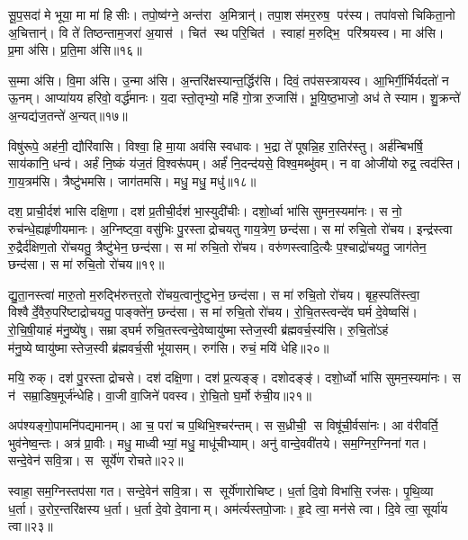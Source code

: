 सू॒प॒सदा॑ मे भूया॒ मा मा॑ हिसीः। तपो॒ष्व॑ग्ने॒ अन्त॑रा अ॒मित्रान्॑। तपा॒शस॑मर॒रुष॒ पर॑स्य। तपा॑वसो चिकिता॒नो अ॒चित्तान्॑। वि ते॑ तिष्ठन्ताम॒जरा॑ अ॒यास॑। चित॑ स्थ परि॒चित॑। स्वाहा॑ म॒रुद्भि॒ परि॑श्रयस्व। मा अ॑सि। प्र॒मा अ॑सि। प्र॒ति॒मा अ॑सि॥१६॥

स॒म्मा अ॑सि। वि॒मा अ॑सि। उ॒न्मा अ॑सि। अ॒न्तरि॑क्षस्यान्त॒र्द्धिर॑सि। दिवं॒ तप॑सस्त्रायस्व। आ॒भिर्गी॒र्भिर्यदतो॑ न ऊ॒नम्। आप्या॑यय हरिवो॒ वर्द्ध॑मानः। य॒दा स्तो॒तृभ्यो॒ महि॑ गो॒त्रा रु॒जासि॑। भू॒यि॒ष्ठ॒भाजो॒ अध॑ ते स्याम। शु॒क्रन्ते॑ अ॒न्यद्य॑ज॒तन्ते॑ अ॒न्यत्॥१७॥

विषु॑रूपे॒ अह॑नी॒ द्यौरि॑वासि। विश्वा॒ हि मा॒या अव॑सि स्वधावः। भ॒द्रा ते॑ पूषन्नि॒ह रा॒तिर॑स्तु। अर्\mbox{}ह॑न्बिभर्\mbox{}षि॒ साय॑कानि॒ धन्व॑। अर्\mbox{}हं नि॒ष्कं य॑ज॒तं  वि॒श्वरू॑पम्। अर्\mbox{}हं॑ नि॒दन्द॑यसे॒ विश्व॒मब्भु॑वम्। न वा ओजी॑यो रुद्र॒ त्वद॑स्ति। गा॒य॒त्रम॑सि। त्रैष्टु॑भमसि। जाग॑तमसि। मधु॒ मधु॒ मधु॑॥१८॥
\anuvakamend[अ॒न॒क्त्व॒सा॒दी॒दु॒त्त॒र॒तः पा॑हि प्रति॒मा अ॑सि यज॒तन्ते॑ अ॒न्यज्जाग॑तम॒स्येकं॑ च]

दश॒ प्राची॒र्दश॑ भासि दक्षि॒णा। दश॑ प्र॒तीची॒र्दश॑ भा॒स्युदी॑चीः। दशो॒र्ध्वा भा॑सि सुमन॒स्यमा॑नः। स नो॒ रुच॑न्धे॒ह्यहृ॑णीयमानः। अ॒ग्निष्ट्वा॒ वसु॑भिः पु॒रस्ताद्रोचयतु गाय॒त्रेण॒ छन्द॑सा। स मा॑ रुचि॒तो रो॑चय। इन्द्र॑स्त्वा रु॒द्रैर्द॑क्षिण॒तो रो॑चयतु॒ त्रैष्टु॑भेन॒ छन्द॑सा। स मा॑ रुचि॒तो रो॑चय। वरु॑णस्त्वादि॒त्यैः प॒श्चाद्रो॑चयतु॒ जाग॑तेन॒ छन्द॑सा। स मा॑ रुचि॒तो रो॑चय॥१९॥

द्यु॒ता॒नस्त्वा॑ मारु॒तो म॒रुद्भि॑रुत्तर॒तो रो॑चय॒त्वानु॑ष्टुभेन॒ छन्द॑सा। स मा॑ रुचि॒तो रो॑चय। बृह॒स्पति॑स्त्वा॒ विश्वैर्दे॒वैरु॒परि॑ष्टाद्रोचयतु॒ पाङ्क्ते॑न॒ छन्द॑सा। स मा॑ रुचि॒तो रो॑चय। रो॒चि॒तस्त्वन्दे॑व घर्म दे॒वेष्वसि॑। रो॒चि॒षी॒याहं म॑नु॒ष्ये॑षु। सम्राड्घर्म रुचि॒तस्त्वन्दे॒वेष्वायु॑ष्मास्तेज॒स्वी ब्र॑ह्मवर्च॒स्य॑सि। रु॒चि॒तो॑ऽहं म॑नु॒ष्येष्वायु॑ष्मास्तेज॒स्वी ब्र॑ह्मवर्च॒सी भू॑यासम्। रुग॑सि। रुचं॒ मयि॑ धेहि॥२०॥

मयि॒ रुक्। दश॑ पु॒रस्ताद्रोचसे। दश॑ दक्षि॒णा। दश॑ प्र॒त्यङ्ङ्। दशोदङ्ङ्॑। दशो॒र्ध्वो भा॑सि सुमन॒स्यमा॑नः। स न॑ सम्रा॒डिष॒मूर्ज॑न्धेहि। वा॒जी वा॒जिने॑ पवस्व। रो॒चि॒तो घ॒र्मो रु॑ची॒य॥२१॥
\anuvakamend[रो॒च॒य॒ धे॒हि॒ नव॑ च]

अप॑श्यङ्गो॒पामनि॑पद्यमानम्। आ च॒ परा॑ च प॒थिभि॒श्चर॑न्तम्। स स॒ध्रीची॒ स विषू॑ची॒र्वसा॑नः। आ व॑रीवर्ति॒ भुव॑नेष्व॒न्तः। अत्र॑ प्रा॒वीः। मधु॒ माध्वीभ्यां॒ मधु॒ माधू॑चीभ्याम्। अनु॑ वान्दे॒ववी॑तये। सम॒ग्निर॒ग्निना॑ गत। सन्दे॒वेन॑ सवि॒त्रा। स सूर्ये॑ण रोचते॥२२॥

स्वाहा॒ सम॒ग्निस्तप॑सा गत। सन्दे॒वेन॑ सवि॒त्रा। स सूर्ये॑णारोचिष्ट। ध॒र्ता दि॒वो विभा॑सि॒ रज॑सः। पृ॒थि॒व्या ध॒र्ता। उ॒रोर॒न्तरि॑क्षस्य ध॒र्ता। ध॒र्ता दे॒वो दे॒वानाम्। अम॑र्त्यस्तपो॒जाः। हृ॒दे त्वा॒ मन॑से त्वा। दि॒वे त्वा॒ सूर्या॑य त्वा॥२३॥

